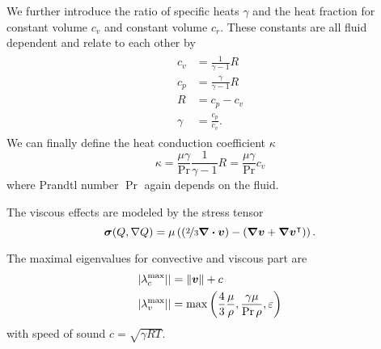 We further introduce the ratio of specific heats $\gamma$ and the heat fraction for constant volume $c_v$ and constant volume $c_r$.
These constants are all fluid dependent and relate to each other by
\begin{align}
  \label{eq:fluid-constants}
  \begin{split}
  c_v &= \frac{1}{\gamma - 1} R \\
  c_p &= \frac{\gamma}{\gamma - 1} R\\
  R &= c_p - c_v\\
  \gamma &= \frac{c_p}{c_v}.
  \end{split}
\end{align}
We can finally define the heat conduction coefficient $\kappa$
\begin{equation}
  \label{eq:heat-conduction-coeff}
  \kappa = \frac{\mu \gamma}{\Pr} \frac{1}{\gamma - 1} R = \frac{\mu \gamma}{\Pr} c_v
\end{equation}
where Prandtl number $\Pr$ again depends on the fluid.


The viscous effects are modeled by the stress tensor
\begin{equation}
  \label{eq:stress-tensor}
  \stressT(Q, \nabla Q) =
  \mu
  \left(
  \left(\nicefrac{2}{3} \divergence{\Qv} \right) -
  \left( \gradient{\Qv} + \gradient{\Qv}^\intercal \right)
  \right).
\end{equation}

The maximal eigenvalues for convective and viscous part are
\begin{align}
  \maxConvEigen \vert  &= \Vert \Qv \Vert + c\\
  \maxViscEigen \vert &= \max \left( \frac{4}{3} \frac{\mu}{\Qrho},
                        \frac{\gamma \mu}{\Pr \Qrho},
                        \diffCoeff \right)
\end{align}
with speed of sound $c = \sqrt{\gamma R T }$.

